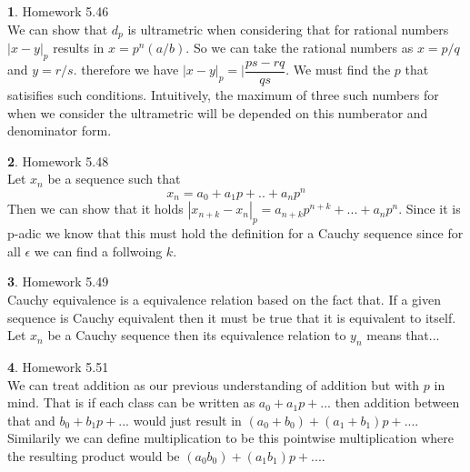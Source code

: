 \documentclass[11pt, twocolumn]{article}
\theoremstyle{definition}
\newtheorem{q}{}
\begin{document}
\begin{q}
    Homework 5.46 \\
    We can show that $ d_p $ is ultrametric when considering that for rational numbers $ | x - y |_p $ results in 
    $ x = p^n (a/b) $. So we can take the rational numbers as $ x = p/q $ and $ y = r/s $. therefore we have
    $ | x - y |_p = |\dfrac{ps - rq}{qs} $. We must find the $ p $ that satisifies such conditions.
    Intuitively, the maximum of three such numbers for when we consider the ultrametric will be depended on this numberator and denominator form.
\end{q}
\begin{q}
    Homework 5.48 \\
    Let $ x_n $ be a sequence such that 
    $$ x_n = a_0 + a_1 p + .. +a_np^n $$ 
    Then we can show that it holds $ |x_{n+k} - x_{n}|_p = a_{n+k}p^{n+k} + ... + a_n p^n $.  
    Since it is p-adic we know that this must hold the definition for a Cauchy sequence since for all $ \epsilon $ we can find a follwoing $k$.
\end{q}
\begin{q}
    Homework 5.49 \\
    Cauchy equivalence is a equivalence relation based on the fact that. If a given sequence is Cauchy equivalent then it must be true that it is equivalent to itself.
    Let $ x_n $ be a Cauchy sequence then its equivalence relation to $ y_n $ means that...  
\end{q}
\begin{q}
    Homework 5.51 \\ 
    We can treat addition as our previous understanding of addition but with $ p $ in mind. 
    That is if each class can be written as $ a_0 + a_1p + ... $ then addition between that and $ b_0 + b_1p + ... $ would just result in 
    $ (a_0 + b_0) + (a_1 + b_1)p + ... $. Similarily we can define multiplication to be this pointwise multiplication where the resulting product would be
    $ (a_0 b_0 ) + (a_1 b_1) p + ... $. 
\end{q}
\end{document}
